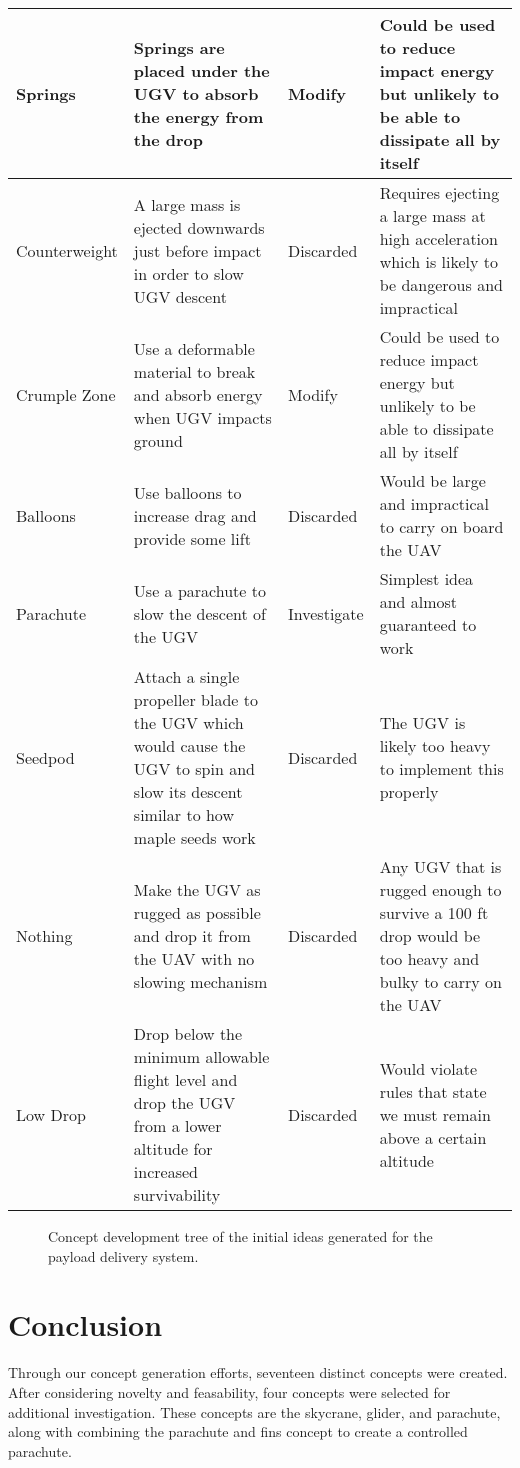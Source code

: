 \documentclass[]{auvsi_doc}
\begin{document}
\begin{center}
\begin{longtable}[H]{|p{}|p{}|p{}|p{}|}
\hline
Springs & Springs are placed under the UGV to absorb the energy from the drop & Modify & Could be used to reduce impact energy but unlikely to be able to dissipate all by itself \\
\hline
Counterweight & A large mass is ejected downwards just before impact in order to slow UGV descent & Discarded & Requires ejecting a large mass at high acceleration which is likely to be dangerous and impractical\\
\hline
Crumple Zone & Use a deformable material to break and absorb energy when UGV impacts ground & Modify & Could be used to reduce impact energy but unlikely to be able to dissipate all by itself\\
\hline
Balloons & Use balloons to increase drag and provide some lift & Discarded & Would be large and impractical to carry on board the UAV \\
\hline
Parachute & Use a parachute to slow the descent of the UGV & Investigate & Simplest idea and almost guaranteed to work \\
\hline
Seedpod & Attach a single propeller blade to the UGV which would cause the UGV to spin and slow its descent similar to how maple seeds work & Discarded & The UGV is likely too heavy to implement this properly\\
\hline
Nothing & Make the UGV as rugged as possible and drop it from the UAV with no slowing mechanism & Discarded & Any UGV that is rugged enough to survive a 100 ft drop would be too heavy and bulky to carry on the UAV \\
\hline
Low Drop & Drop below the minimum allowable flight level and drop the UGV from a lower altitude for increased survivability & Discarded & Would violate rules that state we must remain above a certain altitude\\
\hline
\end{longtable}
\end{center}


\begin{figure}
\centering
{}
\caption{Concept development tree of the initial ideas generated for the payload delivery system.}
\label{fig:ConceptTree}
\end{figure}

\section{Conclusion}
Through our concept generation efforts, seventeen distinct concepts were created. After considering novelty and feasability, four concepts were selected for additional investigation. These concepts are the skycrane, glider, and parachute, along with combining the parachute and fins concept to create a controlled parachute.
\end{document}
